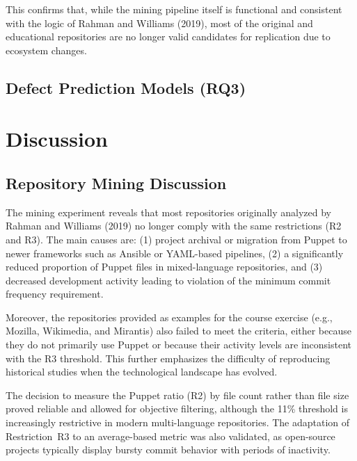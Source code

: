 \documentclass[conference]{IEEEtran}
\begin{document}
This confirms that, while the mining pipeline itself is functional and consistent with the logic of Rahman and Williams (2019), most of the original and educational repositories are no longer valid candidates for replication due to ecosystem changes.

\subsection{Defect Prediction Models (RQ3)}

\section{Discussion}
\subsection{Repository Mining Discussion}
The mining experiment reveals that most repositories originally analyzed by Rahman and Williams (2019) no longer comply with the same restrictions (R2 and R3). The main causes are: (1) project archival or migration from Puppet to newer frameworks such as Ansible or YAML-based pipelines, (2) a significantly reduced proportion of Puppet files in mixed-language repositories, and (3) decreased development activity leading to violation of the minimum commit frequency requirement. 

Moreover, the repositories provided as examples for the course exercise (e.g., Mozilla, Wikimedia, and Mirantis) also failed to meet the criteria, either because they do not primarily use Puppet or because their activity levels are inconsistent with the R3 threshold. This further emphasizes the difficulty of reproducing historical studies when the technological landscape has evolved.

The decision to measure the Puppet ratio (R2) by file count rather than file size proved reliable and allowed for objective filtering, although the 11\% threshold is increasingly restrictive in modern multi-language repositories. The adaptation of Restriction~R3 to an average-based metric was also validated, as open-source projects typically display bursty commit behavior with periods of inactivity.
\end{document}
